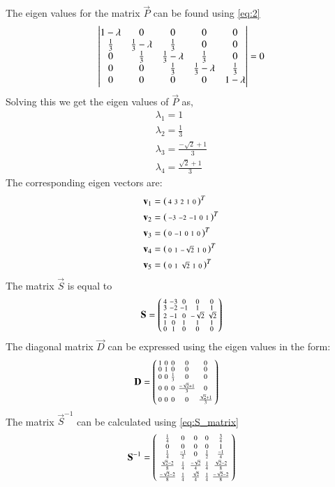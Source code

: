 \documentclass[journal,12pt,twocolumn]{IEEEtran}
\begin{document}
The eigen values for the matrix $\vec{P}$ can be found using \eqref{eq:2}
\begin{align}
 \begin{vmatrix}1-\lambda&0&0&0&0\\\frac{1}{3}&\frac{1}{3}-\lambda&\frac{1}{3}&0&0\\0 &\frac{1}{3}&\frac{1}{3}-\lambda&\frac{1}{3}&0\\0&0&\frac{1}{3}&\frac{1}{3}-\lambda&\frac{1}{3}\\0&0&0&0&1-\lambda\end{vmatrix}=0
\end{align}
Solving this we get the eigen values of $\vec{P}$ as, 
\begin{align}
	\lambda_1 = 1\\
	\lambda_2=  \frac{1}{3}\\
	\lambda_3=  \frac{-\sqrt{2}+1}{3}\\
	\lambda_4=  \frac{\sqrt{2}+1}{3}
\end{align}
The corresponding eigen vectors are:
\begin{align}
	\mathbf v_1 &= \begin{psmallmatrix}4& 3&2&1&0\end{psmallmatrix}^T\\
	\mathbf v_2 &= \begin{psmallmatrix}-3& -2&-1&0&1\end{psmallmatrix}^T\\
	\mathbf v_3 &= \begin{psmallmatrix}0& -1&0&1&0\end{psmallmatrix}^T\\
	\mathbf v_4 &= \begin{psmallmatrix}0& 1&-\sqrt{2}&1&0\end{psmallmatrix}^T\\
	\mathbf v_5 &= \begin{psmallmatrix}0& 1&\sqrt{2}&1&0\end{psmallmatrix}^T
\end{align}
The matrix $\vec{S}$ is equal to
\begin{align}
	\mathbf{S}=\begin{psmallmatrix}
		4 & -3 & 0 & 0 & 0 \\
		3 & -2 & -1 & 1 & 1 \\
		2 & -1 & 0 & -\sqrt{2} & \sqrt{2} \\
		1 & 0 & 1 & 1 & 1 \\
		0 & 1 & 0 & 0 & 0
	\end{psmallmatrix}\label{eq:S_matrix}
\end{align}
The diagonal matrix $\vec{D}$ can be expressed using the eigen values in the form:
\begin{align}
	\mathbf{D} &=\begin{psmallmatrix}
		1 & 0 & 0 & 0 & 0 \\
		0 & 1 & 0 & 0 & 0 \\
		0 & 0 & \frac{1}{3} & 0 & 0 \\
		0 & 0 & 0 & \frac{-\sqrt{2}+1}{3} & 0 \\
		0 & 0 & 0 & 0 & \frac{\sqrt{2}+1}{3}
	\end{psmallmatrix}\label{eq:D_matrix}
\end{align}
The matrix $\vec{S}^{-1}$ can be calculated using \eqref{eq:S_matrix}
\begin{align}
	\mathbf{S}^{-1}=\begin{psmallmatrix}
		\frac{1}{4} & 0 & 0 & 0 & \frac{3}{4} \\
		0 & 0 & 0 & 0 & 1 \\
		\frac{1}{4} & \frac{-1}{2} & 0 & \frac{1}{2} & \frac{-1}{4} \\
		\frac{\sqrt{2}-2}{8} & \frac{1}{4} & \frac{-\sqrt{2}}{4} & \frac{1}{4} & \frac{\sqrt{2}-2}{8} \\
		\frac{-\sqrt{2}-2}{8} & \frac{1}{4} & \frac{\sqrt{2}}{4} & \frac{1}{4} & \frac{-\sqrt{2}-2}{8}
	\end{psmallmatrix}
\end{align}
\end{document}
